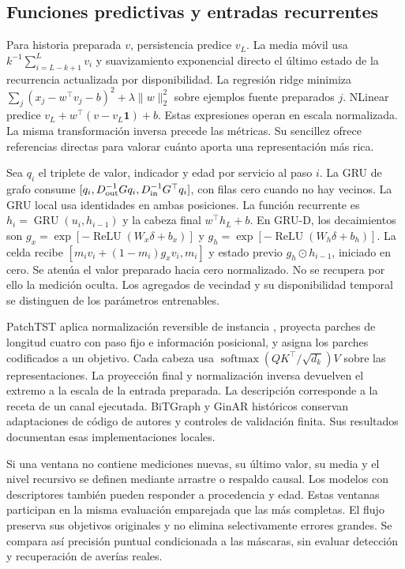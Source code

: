 \subsection{Funciones predictivas y entradas recurrentes}
Para historia preparada $ v $, persistencia predice $ v_L $. La media móvil usa $ k^{-1}\sum_{i=L-k+1}^L v_i $ y suavizamiento exponencial directo el último estado de la recurrencia actualizada por disponibilidad. La regresión ridge \cite{hoerlkennard} minimiza $\sum_j(x_j-w^\top v_j-b)^2+\lambda\|w\|_2^2$ sobre ejemplos fuente preparados $ j $. NLinear predice $ v_L+w^\top(v-v_L\mathbf1)+b $. Estas expresiones operan en escala normalizada. La misma transformación inversa precede las métricas. Su sencillez ofrece referencias directas para valorar cuánto aporta una representación más rica.

Sea $ q_i $ el triplete de valor, indicador y edad por servicio al paso $ i $. La GRU de grafo consume $[q_i,D_{\rm out}^{-1}Gq_i,D_{\rm in}^{-1}G^\top q_i]$, con filas cero cuando no hay vecinos. La GRU local usa identidades en ambas posiciones. La función recurrente es $ h_i=\operatorname{GRU}(u_i,h_{i-1})$ y la cabeza final $ w^\top h_L+b $. En GRU-D, los decaimientos son $ g_x=\exp[-\operatorname{ReLU}(W_x\delta+b_x)]$ y $ g_h=\exp[-\operatorname{ReLU}(W_h\delta+b_h)]$. La celda recibe $[m_iv_i+(1-m_i)g_xv_i,m_i]$ y estado previo $ g_h\odot h_{i-1}$, iniciado en cero. Se atenúa el valor preparado hacia cero normalizado. No se recupera por ello la medición oculta. Los agregados de vecindad y su disponibilidad temporal se distinguen de los parámetros entrenables.

PatchTST aplica normalización reversible de instancia \cite{revin}, proyecta parches de longitud cuatro con paso fijo e información posicional, y asigna los parches codificados a un objetivo. Cada cabeza usa $\operatorname{softmax}(QK^\top/\sqrt{d_k})V $ sobre las representaciones. La proyección final y normalización inversa devuelven el extremo a la escala de la entrada preparada. La descripción corresponde a la receta de un canal ejecutada. BiTGraph y GinAR históricos conservan adaptaciones de código de autores y controles de validación finita. Sus resultados documentan esas implementaciones locales.

Si una ventana no contiene mediciones nuevas, su último valor, su media y el nivel recursivo se definen mediante arrastre o respaldo causal. Los modelos con descriptores también pueden responder a procedencia y edad. Estas ventanas participan en la misma evaluación emparejada que las más completas. El flujo preserva sus objetivos originales y no elimina selectivamente errores grandes. Se compara así precisión puntual condicionada a las máscaras, sin evaluar detección y recuperación de averías reales.
